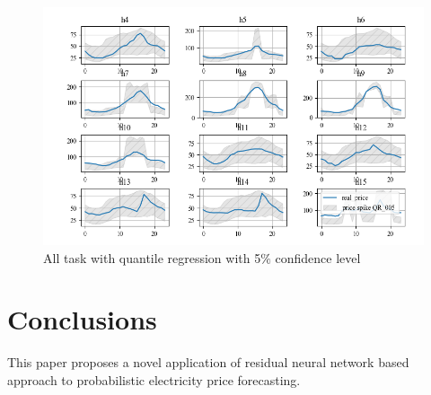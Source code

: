 \documentclass[review]{elsarticle}
\begin{document}
  \begin{figure}[H]
    \includegraphics[width=15cm]{All_task_with_spike_price_QR_005}
    \caption{All task with quantile regression with 5$\%$ confidence level}
    \label{Fig:all_task_QR_005}
  \centering
  \end{figure}

\section{Conclusions}
  This paper proposes a novel application of residual neural network based approach to probabilistic electricity price forecasting.
\end{document}
